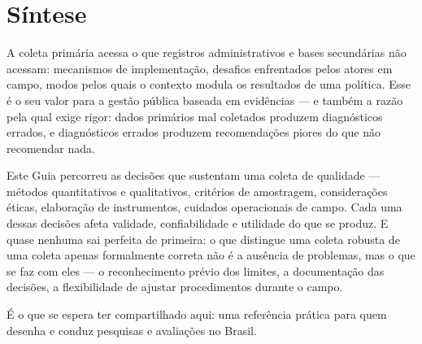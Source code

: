 \documentclass[12pt, a4paper, openany]{book}
\begin{document}
\section{S\'intese}

A coleta prim\'aria acessa o que registros administrativos e bases secund\'arias n\~ao acessam: mecanismos de implementa\c{c}\~ao, desafios enfrentados pelos atores em campo, modos pelos quais o contexto modula os resultados de uma pol\'itica. Esse \'e o seu valor para a gest\~ao p\'ublica baseada em evid\^encias --- e tamb\'em a raz\~ao pela qual exige rigor: dados prim\'arios mal coletados produzem diagn\'osticos errados, e diagn\'osticos errados produzem recomenda\c{c}\~oes piores do que n\~ao recomendar nada.

Este Guia percorreu as decis\~oes que sustentam uma coleta de qualidade --- m\'etodos quantitativos e qualitativos, crit\'erios de amostragem, considera\c{c}\~oes \'eticas, elabora\c{c}\~ao de instrumentos, cuidados operacionais de campo. Cada uma dessas decis\~oes afeta validade, confiabilidade e utilidade do que se produz. E quase nenhuma sai perfeita de primeira: o que distingue uma coleta robusta de uma coleta apenas formalmente correta n\~ao \'e a aus\^encia de problemas, mas o que se faz com eles --- o reconhecimento pr\'evio dos limites, a documenta\c{c}\~ao das decis\~oes, a flexibilidade de ajustar procedimentos durante o campo.

\'E o que se espera ter compartilhado aqui: uma refer\^encia pr\'atica para quem desenha e conduz pesquisas e avalia\c{c}\~oes no Brasil.
\end{document}
